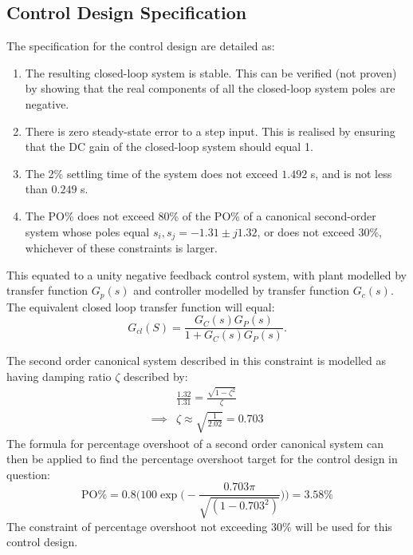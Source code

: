 \documentclass[conference,onecolumn,a4paper,11pt]{IEEEtran}
\begin{document}
\subsection{Control Design Specification}
The specification for the control design are detailed as:
\begin{enumerate}[label=\roman*., ref=\thesubsection(\roman*)]
    \item 
    The resulting closed-loop system is stable. This can be verified
    (not proven) by showing that the real components of all the
    closed-loop system poles are negative.
    \label{spec:stability}

    \item 
    There is zero steady-state error to a step input. This is realised
    by ensuring that the DC gain of the closed-loop system should equal 1.
    \label{spec:sse}

    \item 
    The 2\% settling time of the system does not exceed $1.492$ s,
    and is not less than $0.249$ s.
    \label{spec:settling}

    \item 
    The PO\% does not exceed 80\% of the PO\% of a canonical second-order
    system whose poles equal
    $s_i, s_j = -1.31 \pm j1.32$, or does not exceed 30\%, whichever of
    these constraints is larger.
    \label{spec:overshoot}
\end{enumerate}

This equated to a unity negative feedback control system, with plant modelled by transfer function $G_p(s)$ and controller modelled by transfer function $G_c(s)$. The equivalent closed loop transfer function will equal:
\begin{equation}
G_{cl}(S)=\frac{G_C(s)G_P(s)}{1+G_C(s)G_P(s)}.
\label{eq:g_cl_general}
\end{equation}

The second order canonical system described in this constraint is modelled as having damping ratio $\zeta$ described by: 
\begin{align*}
    &\frac{1.32}{1.31} = \frac{\sqrt{1 - \zeta^2}}{\zeta} \\
    \implies &\zeta \approx \sqrt{\frac{1}{2.02}} = 0.703
\end{align*}
The formula for percentage overshoot of a second order canonical system can then be applied to find the percentage overshoot target for the control design in question:
$$
    \text{PO\%} = 0.8\bigg(100 \exp \big(-\frac{0.703 \pi}{\sqrt{(1 - 0.703^2)}} \big) \bigg) = 3.58\%
$$
The constraint of percentage overshoot not exceeding 30\% will be used for this control design.
\end{document}
